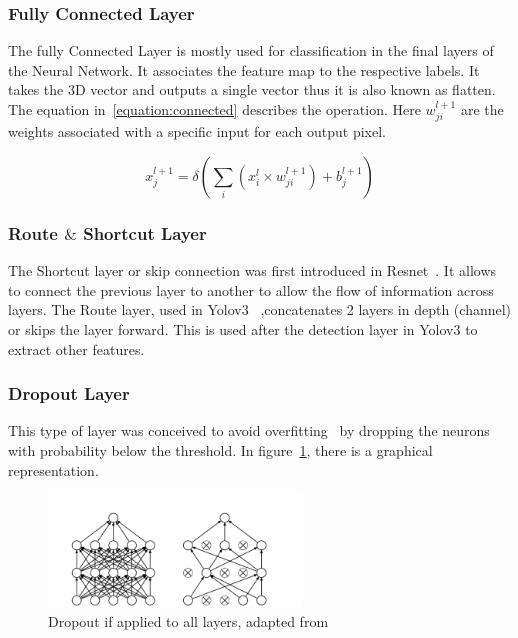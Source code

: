 \subsubsection{Fully Connected Layer}

\quad The fully Connected Layer is mostly used for classification in the final layers of the Neural Network. It associates the feature map to the respective labels.
It takes the 3D vector and outputs a single vector thus it is also known as flatten.
 The equation in~\ref{equation:connected} describes the operation. Here $w_{ji}^{l+1}$ are the weights
 associated with a specific input for each output pixel.



\begin{equation} \label{equation:connected}
     \displaystyle x_{j}^{l+1}=\delta (\sum_{i}(x_{i}^{l} \times w_{ji}^{l+1})+ b_{j}^{l+1})
 \end{equation}
 


\subsubsection{Route $\&$ Shortcut Layer}

\quad The Shortcut layer or skip connection was first introduced in Resnet~\cite{resnet}.
It allows to connect the previous layer to another to allow the flow of information across layers.
The Route layer, used in Yolov3~\cite{yolov3}
,concatenates 2 layers in depth (channel) or skips the layer forward. This is used after the detection layer in Yolov3 to extract other features.

\subsubsection{Dropout Layer}

\quad This type of layer was conceived to avoid overfitting~\cite{Dropout}
by dropping the neurons with probability below the threshold. In figure~\ref{figure:Dropout}, there is a
graphical representation.
\begin{figure}[!htbp]
    \centering
    \includegraphics[width=0.6\textwidth]{Figures/dropout.png}
    \caption{Dropout if applied to all layers, adapted from~\cite{Dropout}}
    \label{figure:Dropout}
\end{figure} 

